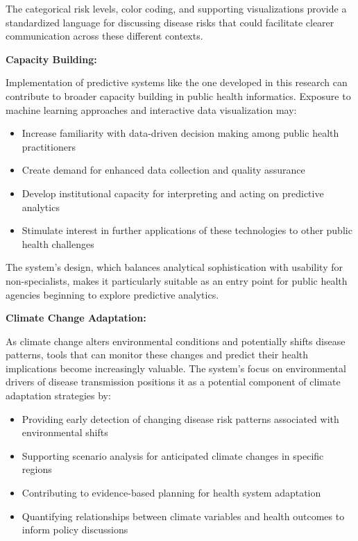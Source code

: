 \documentclass[12pt,a4paper]{report}
\begin{document}
The categorical risk levels, color coding, and supporting visualizations provide a standardized language for discussing disease risks that could facilitate clearer communication across these different contexts.

\textbf{Capacity Building:}

Implementation of predictive systems like the one developed in this research can contribute to broader capacity building in public health informatics. Exposure to machine learning approaches and interactive data visualization may:

\begin{itemize}
    \item Increase familiarity with data-driven decision making among public health practitioners
    \item Create demand for enhanced data collection and quality assurance
    \item Develop institutional capacity for interpreting and acting on predictive analytics
    \item Stimulate interest in further applications of these technologies to other public health challenges
\end{itemize}

The system's design, which balances analytical sophistication with usability for non-specialists, makes it particularly suitable as an entry point for public health agencies beginning to explore predictive analytics.

\textbf{Climate Change Adaptation:}

As climate change alters environmental conditions and potentially shifts disease patterns, tools that can monitor these changes and predict their health implications become increasingly valuable. The system's focus on environmental drivers of disease transmission positions it as a potential component of climate adaptation strategies by:

\begin{itemize}
    \item Providing early detection of changing disease risk patterns associated with environmental shifts
    \item Supporting scenario analysis for anticipated climate changes in specific regions
    \item Contributing to evidence-based planning for health system adaptation
    \item Quantifying relationships between climate variables and health outcomes to inform policy discussions
\end{itemize}
\end{document}
